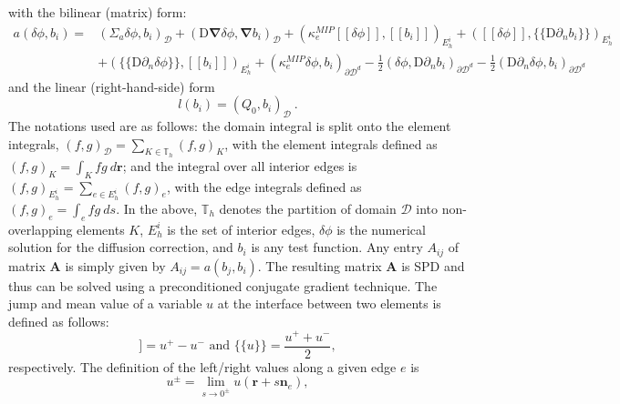 \documentclass[preprint,10pt]{elsarticle}
\newcommand\grad{\boldsymbol{\nabla}}
\newcommand\br{\mathbf{r}}
\newcommand\bs{\boldsymbol}
\newcommand\mc{\mathcal}
\renewcommand{\(}{\left(}
\renewcommand{\)}{\right)}
\renewcommand{\[}{\left[}
\renewcommand{\]}{\right]}
\newcommand\vn{\bs{n}}
\newcommand{\jmp}[1]{[\![#1]\!]}                     %
\newcommand{\mvl}[1]{\{\!\!\{#1\}\!\!\}}             %
\begin{document}
%
with the bilinear (matrix) form:
\begin{equation}
\begin{split}
a(\delta \phi,b_i) =& \(\Sigma_a \delta \phi,b_i\)_{\mc{D}}
  + (\mathrm{D}\grad\delta \phi,\grad b_i)_{\mc{D}} 
	+ \( \kappa_e^{MIP} \jmp{\delta \phi}, \jmp{b_i}      \)_{E_h^i} 
	+ \( \jmp{\delta \phi}, \mvl{\mathrm{D}\partial_nb_i} \)_{E_h^i} \\	
& + \( \mvl{\mathrm{D}\partial_n \delta \phi},\jmp{b_i} \)_{E_h^i} 
  + \(\kappa_e^{MIP} \delta \phi,b_i\)_{\partial \mc{D}^d} 
	- \frac{1}{2} \(\delta \phi,\mathrm{D} \partial_nb_i\)_{\partial \mc{D}^d} 
	- \frac{1}{2} \(\mathrm{D} \partial_n\delta \phi,b_i\)_{\partial \mc{D}^d}
\label{mip_b}
\end{split}
\end{equation}
%
and the linear (right-hand-side) form
%
\begin{equation}
l(b_i) = (Q_0,b_i)_{\mc{D}}\ . %
\label{mip_l}
\end{equation}
%
The notations used are as follows:
the domain integral is split onto the element integrals, $(f,g)_{\mc{D}} = \sum_{K\in \mathbb{T}_h} \(f,g\)_K$, with the element integrals defined as 
$(f,g)_K = \int_K fg\ d\br$; and 
the integral over all interior edges is $(f,g)_{E_h^i}=\sum_{e\in E_h^i}(f,g)_e$, with the edge integrals defined as 
$(f,g)_e = \int_e fg\ ds$. In the above, 
 $\mathbb{T}_h$ denotes the partition of domain
$\mc{D}$ into non-overlapping elements $K$, $E_h^i$ is the set of interior
edges, $\delta \phi$ is the numerical solution for the diffusion correction, and $b_i$ is any test function.
Any entry $A_{ij}$ of matrix $\bs{A}$ is simply given by $A_{ij}= a(b_j,b_i)$. The resulting matrix $\bs{A}$ is SPD
\cite{Arnold1982,arnold2000discontinuous} and thus can be solved using a preconditioned conjugate gradient technique.
%
%
The jump and mean value of a variable $u$  at the interface between two elements is defined as follows:
%
\begin{equation}
\jmp{u} = u^+ - u^- \text{ and } \mvl{u} = \frac{u^+ + u^-}{2} ,
\end{equation}
respectively.
%
The definition of the left/right values along a given edge $e$ is
%
\begin{equation}
u^{\pm}= \lim_{s\rightarrow 0^{\pm}}u(\bs{r}+s\vn_e) ,
\end{equation}
\end{document}
